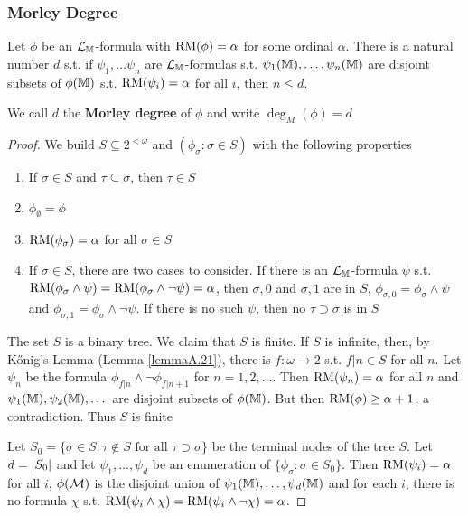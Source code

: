 \documentclass[11pt]{article}
\begin{document}
\subsubsection{Morley Degree}
\label{sec:orgf077487}
\begin{proposition}[]
Let \(\phi\) be an \(\mathcal{L}_{\mathbb{M}}\)-formula with \(\operatorname{RM}(\phi)=\alpha\) for some ordinal \(\alpha\). There is a natural
number \(d\) s.t. if \(\psi_1,\dots\psi_n\) are \(\mathcal{L}_{\mathbb{M}}\)-formulas s.t. \(\psi_1(\mathbb{M}),\dots,\psi_n(\mathbb{M})\) are disjoint
subsets of \(\phi(\mathbb{M})\) s.t. \(\operatorname{RM}(\psi_i)=\alpha\) for all \(i\), then \(n\le d\).

We call \(d\) the \textbf{Morley degree} of \(\phi\) and write \(\deg_M(\phi)=d\)
\end{proposition}

\begin{proof}
We build \(S\subseteq 2^{<\omega}\) and \((\phi_\sigma:\sigma\in S)\) with the following properties
\begin{enumerate}
\item If \(\sigma\in S\) and \(\tau\subseteq\sigma\), then \(\tau\in S\)
\item \(\phi_\emptyset=\phi\)
\item \(\operatorname{RM}(\phi_\sigma)=\alpha\) for all \(\sigma\in S\)
\item If \(\sigma\in S\), there are two cases to consider. If there is an \(\mathcal{L}_{\mathbb{M}}\)-formula \(\psi\)
s.t. \(\operatorname{RM}(\phi_\sigma\wedge\psi)=\operatorname{RM}(\phi_\sigma\wedge\neg\psi)=\alpha\), then \(\sigma,0\) and \(\sigma,1\) are in \(S\), \(\phi_{\sigma,0}=\phi_\sigma\wedge\psi\)
and \(\phi_{\sigma,1}=\phi_\sigma\wedge\neg\psi\). If there is no such \(\psi\), then no \(\tau\supset\sigma\) is in \(S\)
\end{enumerate}


The set \(S\) is a binary tree. We claim that \(S\) is finite. If \(S\) is infinite, then, by
Kőnig's Lemma (Lemma \ref{lemmaA.21}), there is \(f:\omega\to 2\) s.t. \(f|n\in S\) for all \(n\).
Let \(\psi_n\) be the formula \(\phi_{f|n}\wedge\neg\phi_{f|n+1}\) for \(n=1,2,\dots\). Then \(\operatorname{RM}(\psi_n)=\alpha\) for
all \(n\)
and \(\psi_1(\mathbb{M}),\psi_2(\mathbb{M}),\dots\) are disjoint subsets of \(\phi(\mathbb{M})\). But then \(\operatorname{RM}(\phi)\ge\alpha+1\), a
contradiction. Thus \(S\) is finite

Let \(S_0=\{\sigma\in S:\tau\notin S\text{ for all }\tau\supset\sigma\}\) be the terminal nodes of the tree \(S\).
Let \(d=\abs{S_0}\) and let \(\psi_1,\dots,\psi_d\) be an enumeration of \(\{\phi_\sigma:\sigma\in S_0\}\).
Then \(\operatorname{RM}(\psi_i)=\alpha\) for all \(i\), \(\phi(\mathcal{M})\) is the disjoint union of \(\psi_1(\mathbb{M}),\dots,\psi_d(\mathbb{M})\) and for
each \(i\), there is no formula \(\chi\) s.t. \(\operatorname{RM}(\psi_i\wedge\chi)=\operatorname{RM}(\psi_i\wedge\neg\chi)=\alpha\).


\end{proof}
\end{document}

